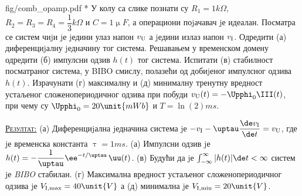 \begin{slikaDesno}{fig/comb_opamp.pdf}
    {\color{red}*}\PID 
У колу са слике познати су $R_1 = 1\unit{k\Omega}$, 
$R_2 = R_3 = R_4 = \dfrac{1}{3}\unit{k\Omega}$ и 
$C = 1\unit{\upmu F}$, а
операциони поjачавач jе идеалан. 
Посматра се систем чиjи jе jедини улаз напон
$v_{\rm U}$ а jедини излаз напон $v_{\rm I}$. 
Одредити 
(а) диференциjалну jедначину тог система. Решавањем у временском домену одредити 
(б) импулсни одзив $h(t)$
тог система. Испитати (в) стабилност посматраног система, у BIBO смислу,
полазећи од добиjеног импулсног одзива $h(t)$. 
Израчунати (г) максималну
и (д) минималну тренутну вредност устаљеног сложенопериодичног одзива
при побуди 
$v_{\rm U} (t) = -\Upphi_0 \III(t)$, 
при чему су $\Upphi_0 = 20\unit{mWb}$ и $T = \ln(2)\unit{ms}$.
\end{slikaDesno}
\vspace*{2mm}

\textsc{\underline{Резултат:}}
(а) Диференциjална jедначина система jе 
$-v_{\rm I} - \uptau \dfrac{\de v_{\rm I}}{\de t} = v_{\rm U}$, где jе временска константа 
$\uptau = 1\unit{ms}$. 
(а) Импулсни одзив jе $h(t) = -\dfrac{1}{\uptau} \ee^{-t/\uptau}\,\uu(t)$. 
(в) Будући да jе 
$ \int_{-\infty}^{\infty} |h(t)| \de t < \infty$
систем jе \textit{BIBO} стабилан. 
(г) Максимална вредност устаљеног сложенопериодичног одзива jе 
$V_{\rm I,max} = 40\unit{V}$ а (д) 
минимална jе $V_{\rm I,min} = 20\unit{V}$.